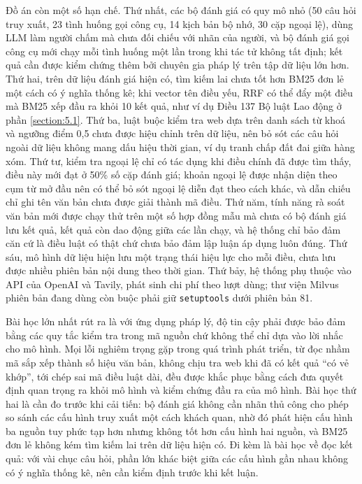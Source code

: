\documentclass[../DoAn.tex]{subfiles}
\begin{document}
Đồ án còn một số hạn chế. Thứ nhất, các bộ đánh giá có quy mô nhỏ (50 câu hỏi truy xuất, 23 tình huống gọi công cụ, 14 kịch bản bộ nhớ, 30 cặp ngoại lệ), dùng LLM làm người chấm mà chưa đối chiếu với nhãn của người, và bộ đánh giá gọi công cụ mới chạy mỗi tình huống một lần trong khi tác tử không tất định; kết quả cần được kiểm chứng thêm bởi chuyên gia pháp lý trên tập dữ liệu lớn hơn. Thứ hai, trên dữ liệu đánh giá hiện có, tìm kiếm lai chưa tốt hơn BM25 đơn lẻ một cách có ý nghĩa thống kê; khi vector tên điều yếu, RRF có thể đẩy một điều mà BM25 xếp đầu ra khỏi 10 kết quả, như ví dụ Điều 137 Bộ luật Lao động ở phần \ref{section:5.1}. Thứ ba, luật buộc kiểm tra web dựa trên danh sách từ khoá và ngưỡng điểm 0,5 chưa được hiệu chỉnh trên dữ liệu, nên bỏ sót các câu hỏi ngoài dữ liệu không mang dấu hiệu thời gian, ví dụ tranh chấp đất đai giữa hàng xóm. Thứ tư, kiểm tra ngoại lệ chỉ có tác dụng khi điều chính đã được tìm thấy, điều này mới đạt ở 50\% số cặp đánh giá; khoản ngoại lệ được nhận diện theo cụm từ mở đầu nên có thể bỏ sót ngoại lệ diễn đạt theo cách khác, và dẫn chiếu chỉ ghi tên văn bản chưa được giải thành mã điều. Thứ năm, tính năng rà soát văn bản mới được chạy thử trên một số hợp đồng mẫu mà chưa có bộ đánh giá lưu kết quả, kết quả còn dao động giữa các lần chạy, và hệ thống chỉ bảo đảm căn cứ là điều luật có thật chứ chưa bảo đảm lập luận áp dụng luôn đúng. Thứ sáu, mô hình dữ liệu hiện lưu một trạng thái hiệu lực cho mỗi điều, chưa lưu được nhiều phiên bản nội dung theo thời gian. Thứ bảy, hệ thống phụ thuộc vào API của OpenAI và Tavily, phát sinh chi phí theo lượt dùng; thư viện Milvus phiên bản đang dùng còn buộc phải giữ \texttt{setuptools} dưới phiên bản 81.

Bài học lớn nhất rút ra là với ứng dụng pháp lý, độ tin cậy phải được bảo đảm bằng các quy tắc kiểm tra trong mã nguồn chứ không thể chỉ dựa vào lời nhắc cho mô hình. Mọi lỗi nghiêm trọng gặp trong quá trình phát triển, từ đọc nhầm mã sắp xếp thành số hiệu văn bản, không chịu tra web khi đã có kết quả ``có vẻ khớp'', tới chép sai mã điều luật dài, đều được khắc phục bằng cách đưa quyết định quan trọng ra khỏi mô hình và kiểm chứng đầu ra của mô hình. Bài học thứ hai là cần đo trước khi cải tiến: bộ đánh giá không cần nhãn thủ công cho phép so sánh các cấu hình truy xuất một cách khách quan, nhờ đó phát hiện cấu hình ba nguồn tuy phức tạp hơn nhưng không tốt hơn cấu hình hai nguồn, và BM25 đơn lẻ không kém tìm kiếm lai trên dữ liệu hiện có. Đi kèm là bài học về đọc kết quả: với vài chục câu hỏi, phần lớn khác biệt giữa các cấu hình gần nhau không có ý nghĩa thống kê, nên cần kiểm định trước khi kết luận.
\end{document}
